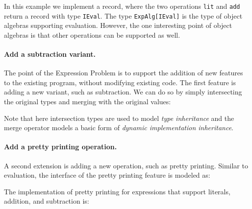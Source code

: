 In this example we implement a record, where the two operations 
\lstinline{lit} and \lstinline{add} return a record with type \lstinline{IEval}.
The type \lstinline$ExpAlg[IEval]$ is the type of object algebras
supporting evaluation. However, the one interesting point
of object algebras is that other operations can be supported as
well. 

\paragraph{Add a subtraction variant.} The point of the Expression
Problem is to support the addition of new features to the existing
program, without modifying existing code. 
The first feature is adding a new variant, such as subtraction. We can do so by
simply intersecting the original types and merging with the original values:

\begin{comment}
  \begin{lstlisting}{language=F2J}
    type SubExpAlg[E] = 
    ExpAlg[E] & {sub: E -> E -> E};
    let subEvalAlg = evalAlg ,, {
      sub = \(x: IEval) (y: IEval) -> { 
        eval = x.eval - y.eval 
      }
    };
  \end{lstlisting}
\end{comment}


\noindent Note that here intersection types are used to model \emph{type
  inheritance} and the merge operator models a basic form of
\emph{dynamic implementation inheritance}. 

\paragraph{Add a pretty printing operation.}
A second extension is adding a new operation, such as pretty printing. 
Similar to evaluation, the interface of the pretty printing feature
is modeled as:
\begin{comment}
  \begin{lstlisting}{language=F2J}
    type IPrint = {print : String};
  \end{lstlisting}
\end{comment}
The implementation of pretty printing for expressions that support literals,
addition, and subtraction is:
\begin{comment}
  \begin{lstlisting}{language=F2J}
    let printAlg : SubExpAlg[IPrint] = {
      lit = \(x: Int) -> {print = x.toString()},
      add = \(x: IPrint) (y: IPrint) -> {
        print = x.print ++ " + " ++ y.print
      },
      sub = \(x: IPrint) (y: IPrint) -> {
        print = x.print ++ " - " ++ y.print
      }
    };
  \end{lstlisting}
\end{comment}

